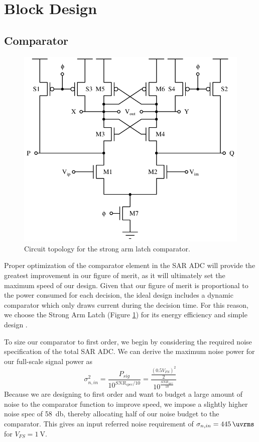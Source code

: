 \documentclass[10pt,journal]{IEEEtran}\usepackage{longtable}
\begin{document}
\section{Block Design}
\subsection{Comparator}
\begin{figure}[tb]
\begin{center}
\includegraphics[width=1\columnwidth]{StrongArmLatch.pdf}
\caption{Circuit topology for the strong arm latch comparator.}
\label{fig:StrongArmLatch}
\end{center}
\end{figure}
Proper optimization of the comparator element in the SAR ADC will provide the greatest improvement in our figure of merit, as it will ultimately set the maximum speed of our design. Given that our figure of merit is proportional to the power consumed for each decision, the ideal design includes a dynamic comparator which only draws current during the decision time. For this reason, we choose the Strong Arm Latch (Figure \ref{fig:StrongArmLatch}) for its energy efficiency and simple design \cite{Razavi:bp}.

To size our comparator to first order, we begin by considering the required noise specification of the total SAR ADC. We can derive the maximum noise power for our full-scale signal power as
\begin{equation}
\sigma_{n,in}^2=\frac{P_{sig}}{10^{SNR_{spec}/10}}=\frac{\frac{\left(0.5V_{FS}\right)^2}{2}}{10^{\frac{SNR_{spec}}{10}}}
\end{equation}
Because we are designing to first order and want to budget a large amount of noise to the comparator function to improve speed, we impose a slightly higher noise spec of \SI{58}{\decibel}, thereby allocating half of our noise budget to the comparator. This gives an input referred noise requirement of $\sigma_{n,in}=\SI{445}{\uvrms}$ for $V_{FS}=\SI{1}{\volt}$.
\end{document}

